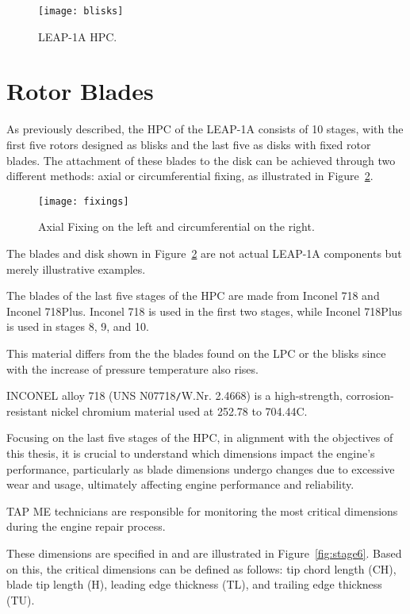 \begin{figure}[H]
    \centering
    \texttt{[image: blisks]}
    \caption{LEAP-1A HPC. \cite{ESM}}
    \label{fig:blisks}
\end{figure}



\section{Rotor Blades}
\label{sec:blades_vanes}

As previously described, the \gls{HPC} of the \gls{LEAP}-1A consists of 10 stages, with the first five rotors designed as blisks and the last five as disks with fixed rotor blades. The attachment of these blades to the disk can be achieved through two different methods: axial or circumferential fixing, as illustrated in Figure~\ref{fig:fixings}.

\begin{figure}[H]
    \centering
    \texttt{[image: fixings]}
    \caption{Axial Fixing on the left and circumferential on the right.\cite{RollsRoyce}}
    \label{fig:fixings}
\end{figure}

The blades and disk shown in Figure~\ref{fig:fixings} are not actual \gls{LEAP}-1A components but merely illustrative examples.

The blades of the last five stages of the HPC are made from Inconel 718 and Inconel 718Plus. Inconel 718 is used in the first two stages, while Inconel 718Plus is used in stages 8, 9, and 10.

This material differs from the the blades found on the LPC or the blisks since with the increase of pressure temperature also rises. 

INCONEL alloy 718 (UNS N07718\texttt{/}W.Nr. 2.4668) is a high-strength, corrosion-resistant nickel chromium material used at \text{-}252.78 to 704.44\textdegree C.~\cite{inconel718}

Focusing on the last five stages of the HPC, in alignment with the objectives of this thesis, it is crucial to understand which dimensions impact the engine's performance, particularly as blade dimensions undergo changes due to excessive wear and usage, ultimately affecting engine performance and reliability.

TAP ME technicians are responsible for monitoring the most critical dimensions during the engine repair process.

These dimensions are specified in \cite{ESM} and are illustrated in Figure~\ref{fig:stage6}. Based on this, the critical dimensions can be defined as follows: tip chord length (CH), blade tip length (H), leading edge thickness (TL), and trailing edge thickness (TU).

